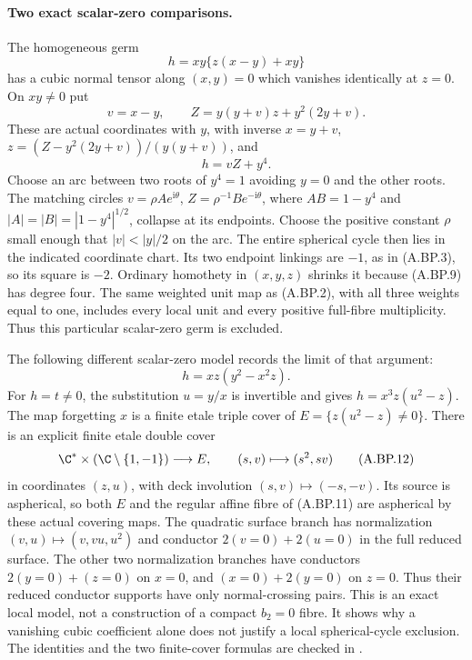 \paragraph{Two exact scalar-zero comparisons.}
The homogeneous germ
\[
                  h=xy\{z(x-y)+xy\}
\tag{A.BP.9}
\]
has a cubic normal tensor along $(x,y)=0$ which
vanishes identically at $z=0$. On $xy\ne0$ put
\[
 v=x-y,\qquad Z=y(y+v)z+y^2(2y+v).
\]
These are actual coordinates with $y$, with inverse
$x=y+v$, $z=(Z-y^2(2y+v))/(y(y+v))$, and
\[
                              h=vZ+y^4.
\tag{A.BP.10}
\]
Choose an arc between two roots of $y^4=1$ avoiding
$y=0$ and the other roots. The matching circles
$v=\rho A e^{\mathrm i\theta}$,
$Z=\rho^{-1}B e^{-\mathrm i\theta}$, where
$AB=1-y^4$ and $|A|=|B|=|1-y^4|^{1/2}$,
collapse at its endpoints. Choose the positive
constant $\rho$ small enough that $|v|<|y|/2$
on the arc. The entire spherical cycle then lies
in the indicated coordinate chart. Its two endpoint
linkings are $-1$, as in (A.BP.3), so its square
is $-2$. Ordinary homothety in $(x,y,z)$ shrinks
it because (A.BP.9) has degree four. The same
weighted unit map as (A.BP.2), with all three
weights equal to one, includes every local unit
and every positive full-fibre multiplicity.
Thus this particular scalar-zero germ is excluded.

The following different scalar-zero model records
the limit of that argument:
\[
                     h=xz(y^2-x^2z).
\tag{A.BP.11}
\]
For $h=t\ne0$, the substitution $u=y/x$ is
invertible and gives $h=x^3 z(u^2-z)$.
The map forgetting $x$ is a finite etale triple
cover of $E=\{z(u^2-z)\ne0\}$.
There is an explicit finite etale double cover
\[
 \C^*\times(\C\setminus\{1,-1\})\longrightarrow E,
                  \qquad(s,v)\longmapsto(s^2,sv)
\tag{A.BP.12}
\]
in coordinates $(z,u)$, with deck involution
$(s,v)\mapsto(-s,-v)$. Its source is aspherical,
so both $E$ and the regular affine fibre of
(A.BP.11) are aspherical by these actual covering
maps. The quadratic surface branch has normalization
$(v,u)\mapsto(v,vu,u^2)$ and conductor
$2(v=0)+2(u=0)$ in the full reduced surface.
The other two normalization branches have conductors
$2(y=0)+(z=0)$ on $x=0$, and
$(x=0)+2(y=0)$ on $z=0$.
Thus their reduced conductor supports have only
normal-crossing pairs. This is an exact local
model, not a construction of a compact $b_2=0$
fibre. It shows why a vanishing cubic coefficient
alone does not justify a local spherical-cycle
exclusion. The identities and the two finite-cover
formulas are checked in .
